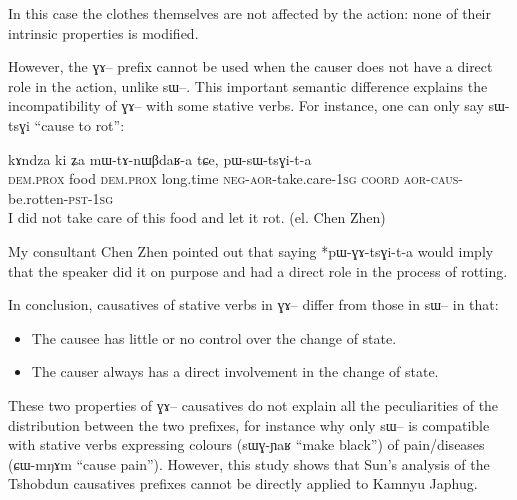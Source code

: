 \documentclass[oldfontcommands,oneside,a4paper,11pt]{memoir}
\newcommand{\ipa}[1]{{\phon #1}} %
\newcommand{\wav}[1]{}%
\newcommand{\aor}{\textsc{aor}}
\newcommand{\caus}{\textsc{caus}}
\newcommand{\coord}{\textsc{coord}}
\newcommand{\dem}{\textsc{dem}}
\newcommand{\emphat}{\textsc{emph}}
\newcommand{\inftv}{\textsc{inf}}
\newcommand{\negat}{\textsc{neg}}
\newcommand{\npst}{\textsc{n.pst}}
\newcommand{\poss}{\textsc{poss}}
\newcommand{\prox}{\textsc{prox}}
\newcommand{\pst}{\textsc{pst}}
\newcommand{\sg}{\textsc{sg}}
\begin{document}
     
In this case  the clothes themselves are not affected by the action: none of their intrinsic properties is modified.  



However, the \ipa{ɣɤ}-- prefix cannot be used when the causer does not have a direct role in the action, unlike \ipa{sɯ}--. This important semantic difference explains  the incompatibility of \ipa{ɣɤ}-- with some stative verbs. For instance, one can only say  \ipa{sɯ-tsɣi} ``cause to rot'':
     \begin{exe}
   \ex 
\gll \ipa{kɯki}  	\ipa{kɤndza}  	\ipa{ki}  	\ipa{ʑa}  	\ipa{mɯ-tɤ-nɯβdaʁ-a}  	\ipa{tɕe,}  	\ipa{pɯ-sɯ-tsɣi-t-a}    \\
   \dem{}.\prox{} food \dem{}.\prox{} long.time \negat{}-\aor{}-take.care-1\sg{} \coord{} \aor{}-\caus{}-be.rotten-\pst{}-1\sg{}  \\
 \glt  I did not take care of this food and let it rot.    (el. Chen Zhen) \wav{8_sWtsGi}
   \end{exe} 
My consultant Chen Zhen pointed out that saying *pɯ-ɣɤ-tsɣi-t-a would imply that the speaker did it on purpose and had a direct role in the process of rotting.
 

In conclusion, causatives of stative verbs in \ipa{ɣɤ}-- differ from those in \ipa{sɯ}--  in that:
\begin{itemize}
\item  The causee has little or no control over the change of state.
\item The causer always has a direct involvement in the change of state.
\end{itemize}
These two properties of \ipa{ɣɤ}-- causatives  do not explain all the peculiarities of the distribution between the two prefixes, for instance why only \ipa{sɯ}-- is compatible with  stative verbs expressing colours (\ipa{sɯɣ-ɲaʁ} ``make black'') of pain/diseases (\ipa{ɕɯ-mŋɤm} ``cause pain''). However, this study shows that Sun's analysis of the Tshobdun causatives prefixes cannot be directly applied to Kamnyu Japhug.
 
\end{document}
